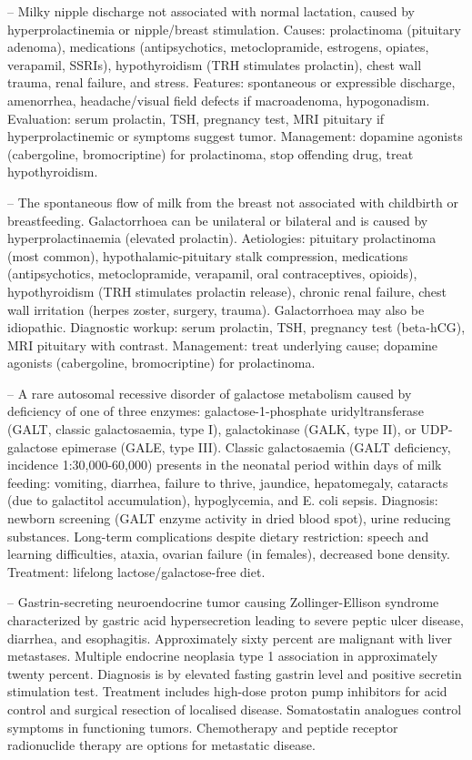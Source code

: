 -- Milky nipple discharge not associated with normal lactation, caused by hyperprolactinemia or nipple/breast stimulation. Causes: prolactinoma (pituitary adenoma), medications (antipsychotics, metoclopramide, estrogens, opiates, verapamil, SSRIs), hypothyroidism (TRH stimulates prolactin), chest wall trauma, renal failure, and stress. Features: spontaneous or expressible discharge, amenorrhea, headache/visual field defects if macroadenoma, hypogonadism. Evaluation: serum prolactin, TSH, pregnancy test, MRI pituitary if hyperprolactinemic or symptoms suggest tumor. Management: dopamine agonists (cabergoline, bromocriptine) for prolactinoma, stop offending drug, treat hypothyroidism.

-- The spontaneous flow of milk from the breast not associated with childbirth or breastfeeding. Galactorrhoea can be unilateral or bilateral and is caused by hyperprolactinaemia (elevated prolactin). Aetiologies: pituitary prolactinoma (most common), hypothalamic-pituitary stalk compression, medications (antipsychotics, metoclopramide, verapamil, oral contraceptives, opioids), hypothyroidism (TRH stimulates prolactin release), chronic renal failure, chest wall irritation (herpes zoster, surgery, trauma). Galactorrhoea may also be idiopathic. Diagnostic workup: serum prolactin, TSH, pregnancy test (beta-hCG), MRI pituitary with contrast. Management: treat underlying cause; dopamine agonists (cabergoline, bromocriptine) for prolactinoma.

-- A rare autosomal recessive disorder of galactose metabolism caused by deficiency of one of three enzymes: galactose-1-phosphate uridyltransferase (GALT, classic galactosaemia, type I), galactokinase (GALK, type II), or UDP-galactose epimerase (GALE, type III). Classic galactosaemia (GALT deficiency, incidence 1:30,000-60,000) presents in the neonatal period within days of milk feeding: vomiting, diarrhea, failure to thrive, jaundice, hepatomegaly, cataracts (due to galactitol accumulation), hypoglycemia, and E. coli sepsis. Diagnosis: newborn screening (GALT enzyme activity in dried blood spot), urine reducing substances. Long-term complications despite dietary restriction: speech and learning difficulties, ataxia, ovarian failure (in females), decreased bone density. Treatment: lifelong lactose/galactose-free diet.

-- Gastrin-secreting neuroendocrine tumor causing Zollinger-Ellison syndrome characterized by gastric acid hypersecretion leading to severe peptic ulcer disease, diarrhea, and esophagitis. Approximately sixty percent are malignant with liver metastases. Multiple endocrine neoplasia type 1 association in approximately twenty percent. Diagnosis is by elevated fasting gastrin level and positive secretin stimulation test. Treatment includes high-dose proton pump inhibitors for acid control and surgical resection of localised disease. Somatostatin analogues control symptoms in functioning tumors. Chemotherapy and peptide receptor radionuclide therapy are options for metastatic disease.

